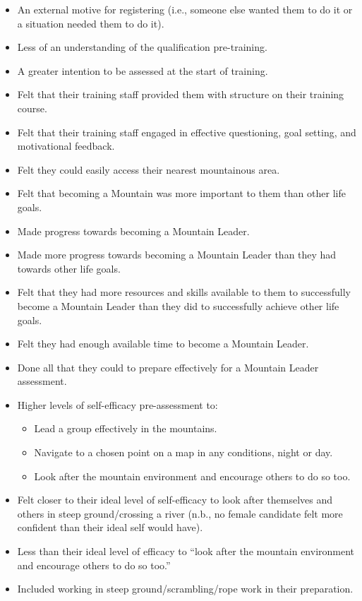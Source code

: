 \documentclass[
  12pt,
  a4paper,
]{book}
\providecommand{\tightlist}{%
  \setlength{\itemsep}{0pt}\setlength{\parskip}{0pt}}
\begin{document}
\begin{itemize}
\tightlist
\item
  An external motive for registering (i.e., someone else wanted them to do it or a situation needed them to do it).
\item
  Less of an understanding of the qualification pre-training.
\item
  A greater intention to be assessed at the start of training.
\item
  Felt that their training staff provided them with structure on their training course.
\item
  Felt that their training staff engaged in effective questioning, goal setting, and motivational feedback.
\item
  Felt they could easily access their nearest mountainous area.
\item
  Felt that becoming a Mountain was more important to them than other life goals.
\item
  Made progress towards becoming a Mountain Leader.
\item
  Made more progress towards becoming a Mountain Leader than they had towards other life goals.
\item
  Felt that they had more resources and skills available to them to successfully become a Mountain Leader than they did to successfully achieve other life goals.
\item
  Felt they had enough available time to become a Mountain Leader.
\item
  Done all that they could to prepare effectively for a Mountain Leader assessment.
\item
  Higher levels of self-efficacy pre-assessment to:

  \begin{itemize}
  \tightlist
  \item
    Lead a group effectively in the mountains.
  \item
    Navigate to a chosen point on a map in any conditions, night or day.
  \item
    Look after the mountain environment and encourage others to do so too.
  \end{itemize}
\item
  Felt closer to their ideal level of self-efficacy to look after themselves and others in steep ground/crossing a river (n.b., no female candidate felt more confident than their ideal self would have).
\item
  Less than their ideal level of efficacy to ``look after the mountain environment and encourage others to do so too.''
\item
  Included working in steep ground/scrambling/rope work in their preparation.
\end{itemize}
\end{document}
